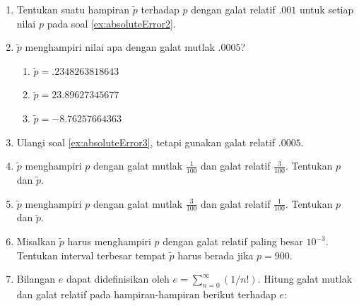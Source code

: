 \begin{enumerate}
\begin{enumerate}
\item \label{exc:abserr4}$p=\pi$ \hasasolution 
\item $p=\sqrt{5}$
\item \label{exc:abserr5}$p=\ln(3)$ \hasasolution 
\item $p=\sqrt{23}^{\sqrt{23}}$
\item \label{exc:abserr6}$p=\frac{10}{\ln(1.1)}$ \hasasolution 
\item $p=\tan(1.57079)$
\end{enumerate}
\item \label{exc:abserr17}Tentukan suatu hampiran $\tilde{p}$ terhadap
$p$ dengan galat relatif $.001$ untuk setiap nilai $p$ pada soal
\ref{ex:absoluteError2}. \haspartwithsolution 
\item \label{ex:absoluteError3}$\tilde{p}$ menghampiri nilai apa dengan
galat mutlak $.0005$?

\begin{enumerate}
\item \label{exc:abserr7}$\tilde{p}=.2348263818643$ \hasananswer 
\item $\tilde{p}=23.89627345677$
\item $\tilde{p}=-8.76257664363$
\end{enumerate}
\item \label{exc:abserr18}Ulangi soal \ref{ex:absoluteError3}, tetapi
gunakan galat relatif $.0005$. \haspartwithanswer 
\item \label{exc:abserr8}$\tilde{p}$ menghampiri $p$ dengan galat mutlak
$\frac{1}{100}$ dan galat relatif $\frac{3}{100}$. Tentukan $p$
dan $\tilde{p}$. \hasananswer 
\item $\tilde{p}$ menghampiri $p$ dengan galat mutlak $\frac{3}{100}$
dan galat relatif $\frac{1}{100}$. Tentukan $p$ dan $\tilde{p}$.
\item Misalkan $\tilde{p}$ harus menghampiri $p$ dengan galat relatif
paling besar $10^{-3}$. Tentukan interval terbesar tempat $\tilde{p}$
harus berada jika $p=900$.
\item Bilangan $e$ dapat didefinisikan oleh $e=\sum_{n=0}^{\infty}(1/n!)$.
Hitung galat mutlak dan galat relatif pada hampiran-hampiran berikut
terhadap $e$:


\end{enumerate}
